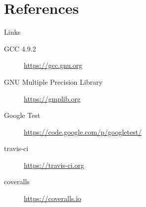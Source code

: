 \documentclass[presentation]{beamer}
\begin{document}
\section{References}
\label{sec:orgheadline1}
\begin{frame}[label=sec-5-1]{Links}
\begin{description}
\item[{GCC 4.9.2}] \url{https://gcc.gnu.org}
\item[{GNU Multiple Precision Library}] \url{https://gmplib.org}
\item[{Google Test}] \url{https://code.google.com/p/googletest/}
\item[{travis-ci}] \url{https://travis-ci.org}
\item[{coveralls}] \url{https://coveralls.io}
\end{description}
\end{frame}
\end{document}
